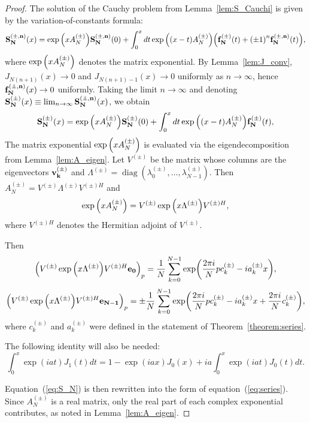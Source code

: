 \documentclass{article}
\begin{document}
\begin{proof}
The solution of the Cauchy problem from Lemma~\ref{lem:S_Cauchi} is given by the variation-of-constants formula:
\begin{equation}
\vb{S^{(\pm, n)}_N}(x) = \exp\qty(x A^{(\pm)}_N) \vb{S^{(\pm,n)}_N}(0) + \int_0^{x} dt \exp\qty((x-t) A^{(\pm)}_N) \qty(\vb{f^{(\pm)}_N}(t) + \qty(\pm 1)^n \vb{f^{(\pm,n)}_N}(t)),
\end{equation}
where $\exp\qty(x A^{(\pm)}_N)$ denotes the matrix exponential.
By Lemma~\ref{lem:J_conv}, $J_{N(n+1)}(x) \to 0$ and $J_{N(n+1)-1}(x) \to 0$ uniformly as $n \to \infty$, hence $\vb{f^{(\pm,n)}_N}(x) \to 0$ uniformly. Taking the limit $n \to \infty$ and denoting $\vb{S^{(\pm)}_N}(x) \equiv \lim_{n\to\infty} \vb{S^{(\pm,n)}_N}(x)$, we obtain
\begin{equation}
\label{eq:S_N}
\vb{S^{(\pm)}_N}(x) = \exp\qty(x A^{(\pm)}_N) \vb{S^{(\pm)}_N}(0) + \int_0^{x} dt \exp\qty((x-t) A^{(\pm)}_N) \vb{f^{(\pm)}_N}(t),
\end{equation}
The matrix exponential $\exp\qty(x A^{(\pm)}_N)$ is evaluated via the eigendecomposition from Lemma~\ref{lem:A_eigen}.
Let $V^{(\pm)}$ be the matrix whose columns are the eigenvectors $\vb{v^{(\pm)}_k}$ and $\Lambda^{(\pm)} = \operatorname{diag}(\lambda^{(\pm)}_0,\dots,\lambda^{(\pm)}_{N-1})$.
Then $A^{(\pm)}_N = V^{(\pm)} \Lambda^{(\pm)} V^{(\pm)H}$ and
\begin{equation}
\exp\qty(x A^{(\pm)}_N) = V^{(\pm)} \exp\qty(x \Lambda^{(\pm)}) V^{(\pm)H},
\end{equation}
where $V^{(\pm)H}$ denotes the Hermitian adjoint of $V^{(\pm)}$.

Then
\begin{equation}
\qty(V^{(\pm)} \exp\qty(x \Lambda^{(\pm)}) V^{(\pm)H} \vb{e_0})_p = \frac{1}{N} \sum_{k=0}^{N-1} \exp(\frac{2\pi i}{N} p c^{(\pm)}_k - i a^{(\pm)}_k x),
\end{equation}
\begin{equation}
\qty(V^{(\pm)} \exp\qty(x \Lambda^{(\pm)}) V^{(\pm)H} \vb{e_{N-1}})_p = \pm \frac{1}{N} \sum_{k=0}^{N-1} \exp(\frac{2\pi i}{N} p c^{(\pm)}_k - i a^{(\pm)}_k x + \frac{2\pi i}{N} c^{(\pm)}_k),
\end{equation}
where $c^{(\pm)}_k$ and $a^{(\pm)}_k$ were defined in the statement of Theorem~\ref{theorem:series}.

The following identity will also be needed:
\begin{equation}
\int_0^x \exp(i a t) J_1(t) dt = 1 - \exp(iax) J_0(x) + i a \int_0^x \exp(i a t) J_0(t) dt.
\end{equation}

Equation~(\ref{eq:S_N}) is then rewritten into the form of equation~(\ref{eq:series}).
Since $A^{(\pm)}_N$ is a real matrix, only the real part of each complex exponential contributes, as noted in Lemma~\ref{lem:A_eigen}.

\end{proof}
\end{document}
